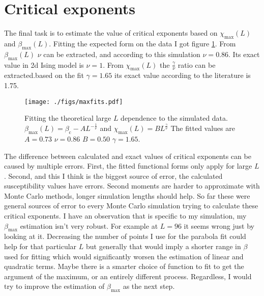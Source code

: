 \documentclass[pdftex,12pt,a4paper]{article}
\begin{document}
\section{Critical exponents}

The final task is to estimate the value of critical exponents based on $\chi_{\mathrm{max}}(L)$ and $\beta_{\mathrm{max}}(L)$. Fitting the expected form on the data I got figure \ref{maxfits}. From $\beta_{\mathrm{max}}(L)$ $\nu$ can be extracted, and according to this simulation $\nu=0.86$. Its exact value in 2d Ising model is $\nu=1$. From $\chi_{\mathrm{max}}(L)$ the $\frac{\gamma}{\nu}$ ratio can be extracted.based on the fit $\gamma=1.65$ its exact value according to the literature is 1.75.

\begin{figure}[!h]
	\centering
	\texttt{[image: ./figs/maxfits.pdf]}
	\caption{Fitting the theoretical large $L$ dependence to the simulated data. $\beta_{\mathrm{max}}(L) = \beta_{\mathrm{c}} - AL^{-\frac{1}{\nu}}$ and $\chi_{\mathrm{max}}(L) = BL^{\frac{\gamma}{\nu}}$ The fitted values are $A=0.73$ $\nu=0.86$ $B=0.50$ $\gamma=1.65$.}
	\label{maxfits}
\end{figure}

The difference between calculated and exact values of critical exponents can be caused by multiple errors. First, the fitted functional forms only apply for large $L$. Second, and this I think is the biggest source of error, the calculated susceptibility values have errors. Second moments are harder to approximate with Monte Carlo methods, longer simulation lengths should help. So far these were general sources of error to every Monte Carlo simulation trying to calculate these critical exponents. I have an observation that is specific to my simulation, my $\beta_{\mathrm{max}}$ estimation isn't very robust. For example at $L=96$ it seems wrong just by looking at it. Decreasing the number of points I use for the parabola fit could help for that particular $L$ but generally that would imply a shorter range in $\beta$ used for fitting which would significantly worsen the estimation of linear and quadratic terms. Maybe there is a smarter choice of function to fit to get the argument of the maximum, or an entirely different process. Regardless, I would try to improve the estimation of $\beta_{\mathrm{max}}$ as the next step.
\end{document}

